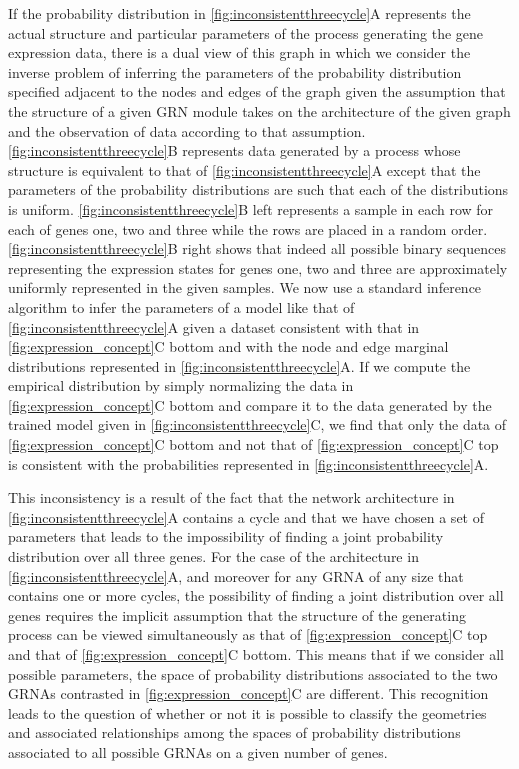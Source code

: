 If the probability distribution in \ref{fig:inconsistentthreecycle}A represents the actual structure and particular parameters of the process generating the gene expression data, there is a dual view of this graph in which we consider the inverse problem of inferring the parameters of the probability distribution specified adjacent to the nodes and edges of the graph given the assumption that the structure of a given GRN module takes on the architecture of the given graph and the observation of data according to that assumption. \ref{fig:inconsistentthreecycle}B represents data generated by a process whose structure is equivalent to that of \ref{fig:inconsistentthreecycle}A except that the parameters of the probability distributions are such that each of the distributions is uniform. \ref{fig:inconsistentthreecycle}B left represents a sample in each row for each of genes one, two and three while the rows are placed in a random order. \ref{fig:inconsistentthreecycle}B right shows that indeed all possible binary sequences representing the expression states for genes one, two and three are approximately uniformly represented in the given samples. We now use a standard inference algorithm \cite{Barber2012} to infer the parameters of a model like that of \ref{fig:inconsistentthreecycle}A given a dataset consistent with that in \ref{fig:expression_concept}C bottom and with the node and edge marginal distributions represented in \ref{fig:inconsistentthreecycle}A. If we compute the empirical distribution by simply normalizing the data in \ref{fig:expression_concept}C bottom and compare it to the data generated by the trained model given in \ref{fig:inconsistentthreecycle}C, we find that only the data of \ref{fig:expression_concept}C bottom and not that of \ref{fig:expression_concept}C top is consistent with the probabilities represented in \ref{fig:inconsistentthreecycle}A.

This inconsistency is a result of the fact that the network architecture in \ref{fig:inconsistentthreecycle}A contains a cycle \cite{Geiger2006,Wainwright2007} and that we have chosen a set of parameters that leads to the impossibility of finding a joint probability distribution over all three genes. For the case of the architecture in \ref{fig:inconsistentthreecycle}A, and moreover for any GRNA of any size that contains one or more cycles, the possibility of finding a joint distribution over all genes requires the implicit assumption that the structure of the generating process can be viewed simultaneously as that of \ref{fig:expression_concept}C top and that of \ref{fig:expression_concept}C bottom. This means that if we consider all possible parameters, the space of probability distributions associated to the two GRNAs contrasted in \ref{fig:expression_concept}C are different. This recognition leads to the question of whether or not it is possible to classify the geometries and associated relationships among the spaces of probability distributions associated to all possible GRNAs on a given number of genes.

